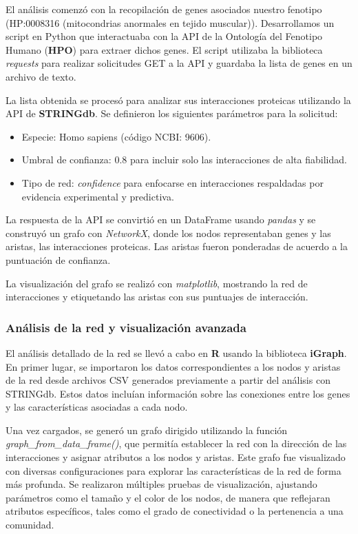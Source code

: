 El análisis comenzó con la recopilación de genes asociados nuestro fenotipo (HP:0008316 (mitocondrias anormales en tejido muscular)). Desarrollamos un script en Python que interactuaba con la API de la Ontología del Fenotipo Humano (\textbf{HPO}) para extraer dichos genes. El script utilizaba la biblioteca \textit{requests} para realizar solicitudes GET a la API y guardaba la lista de genes en un archivo de texto.

La lista obtenida se procesó para analizar sus interacciones proteicas utilizando la API de \textbf{STRINGdb}. Se definieron los siguientes parámetros para la solicitud:

\begin{itemize}
	\item Especie: Homo sapiens (código NCBI: 9606).
	\item Umbral de confianza: 0.8 para incluir solo las interacciones de alta fiabilidad.
	\item Tipo de red: \textit{confidence} para enfocarse en interacciones respaldadas por evidencia experimental y predictiva.
\end{itemize}

La respuesta de la API se convirtió en un DataFrame usando \textit{pandas} y se construyó un grafo con \textit{NetworkX}, donde los nodos representaban genes y las aristas, las interacciones proteicas. Las aristas fueron ponderadas de acuerdo a la puntuación de confianza.

La visualización del grafo se realizó con \textit{matplotlib}, mostrando la red de interacciones y etiquetando las aristas con sus puntuajes de interacción.

\subsubsection{\textbf{Análisis de la red y visualización avanzada}}

El análisis detallado de la red se llevó a cabo en \textbf{R} usando la biblioteca \textbf{iGraph}. En primer lugar, se importaron los datos correspondientes a los nodos y aristas de la red desde archivos CSV generados previamente a partir del análisis con STRINGdb. Estos datos incluían información sobre las conexiones entre los genes y las características asociadas a cada nodo.

Una vez cargados, se generó un grafo dirigido utilizando la función \textit{graph\_from\_data\_frame()}, que permitía establecer la red con la dirección de las interacciones y asignar atributos a los nodos y aristas. Este grafo fue visualizado con diversas configuraciones para explorar las características de la red de forma más profunda. Se realizaron múltiples pruebas de visualización, ajustando parámetros como el tamaño y el color de los nodos, de manera que reflejaran atributos específicos, tales como el grado de conectividad o la pertenencia a una comunidad.

